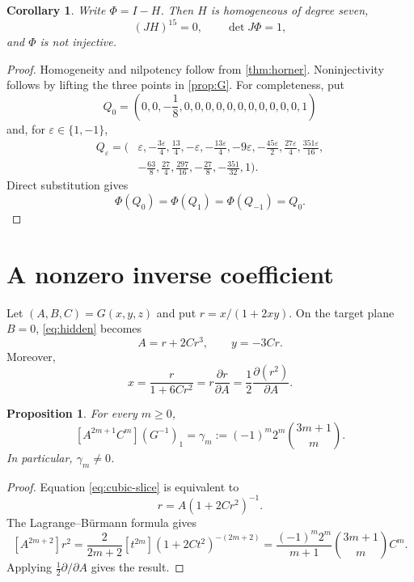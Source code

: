 \documentclass[11pt,reqno]{amsart}
\newtheorem{proposition}[theorem]{Proposition}
\newtheorem{corollary}[theorem]{Corollary}
\begin{document}
\begin{corollary}\label{cor:explicit-map}
Write $\Phi=I-H$.  Then $H$ is homogeneous of degree seven,
\[
 (JH)^{15}=0,
 \qquad
 \det J\Phi=1,
\]
and $\Phi$ is not injective.
\end{corollary}

\begin{proof}
Homogeneity and nilpotency follow from \cref{thm:horner}.  Noninjectivity
follows by lifting the three points in \cref{prop:G}.  For completeness,
put
\[
 Q_0=\left(0,0,-\frac18,0,0,0,0,0,0,0,0,0,0,0,1\right)
\]
and, for $\varepsilon\in\{1,-1\}$,
\[
\begin{split}
 Q_\varepsilon=\bigg(&
 \varepsilon,-\frac{3\varepsilon}{4},\frac{13}{4},
 -\varepsilon,-\frac{13\varepsilon}{4},
 -9\varepsilon,-\frac{45\varepsilon}{2},
 \frac{27\varepsilon}{4},\frac{351\varepsilon}{16},\\
 &-\frac{63}{8},\frac{27}{4},\frac{297}{16},
 -\frac{27}{8},-\frac{351}{32},1\bigg).
\end{split}
\]
Direct substitution gives
\[
 \Phi(Q_0)=\Phi(Q_1)=\Phi(Q_{-1})=Q_0.
\]
\end{proof}

\section{A nonzero inverse coefficient}

Let $(A,B,C)=G(x,y,z)$ and put $r=x/(1+2xy)$.  On the target plane $B=0$,
\eqref{eq:hidden} becomes
\begin{equation}\label{eq:cubic-slice}
 A=r+2Cr^3,
 \qquad
 y=-3Cr.
\end{equation}
Moreover,
\[
 x=\frac{r}{1+6Cr^2}
 =r\frac{\partial r}{\partial A}
 =\frac12\frac{\partial(r^2)}{\partial A}.
\]

\begin{proposition}\label{prop:gamma}
For every $m\geq0$,
\[
 [A^{2m+1}C^m](G^{-1})_1
 =\gamma_m
 :=(-1)^m2^m\binom{3m+1}{m}.
\]
In particular, $\gamma_m\neq0$.
\end{proposition}

\begin{proof}
Equation \eqref{eq:cubic-slice} is equivalent to
\[
 r=A(1+2Cr^2)^{-1}.
\]
The Lagrange--B\"urmann formula gives
\[
 [A^{2m+2}]r^2
 =\frac{2}{2m+2}[t^{2m}](1+2Ct^2)^{-(2m+2)}
 =\frac{(-1)^m2^m}{m+1}\binom{3m+1}{m}C^m.
\]
Applying $\frac12\partial/\partial A$ gives the result.
\end{proof}
\end{document}
